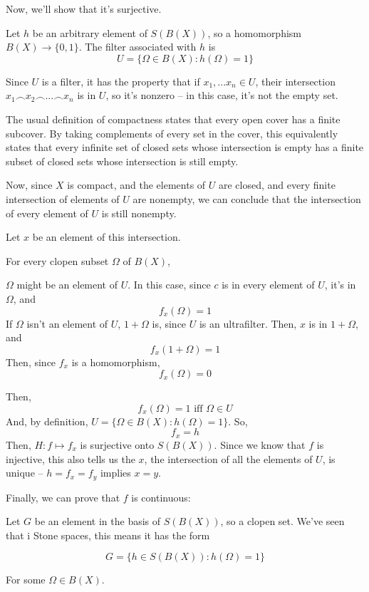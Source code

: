 \documentclass{article}
\begin{document}
      Now, we'll show that it's surjective.

      Let $h$ be an arbitrary element of $S(B(X))$, so a homomorphism $B(X)
      \rightarrow \{0,1\}$. The filter associated with $h$ is
      \[U = \{\Omega \in B(X) : h(\Omega) = 1\}\]

      Since $U$ is a filter, it has the property that if $x_1, ... x_n \in U$,
      their intersection $x_1 \frown x_2 \frown ... \frown x_n$ is in $U$, so
      it's nonzero -- in this case, it's not the empty set.

      The usual definition of compactness states that every open cover has a
      finite subcover. By taking complements of every set in the cover, this
      equivalently states that every infinite set of closed sets whose
      intersection is empty has a finite subset of closed sets whose
      intersection is still empty.

      Now, since $X$ is compact, and the elements of $U$ are closed, and every
      finite intersection of elements of $U$ are nonempty, we can conclude that
      the intersection of every element of $U$ is still nonempty.

      Let $x$ be an element of this intersection.

      For every clopen subset $\Omega$ of $B(X)$,

      $\Omega$ might be an element of $U$. In this case, since $c$ is in every
      element of $U$, it's in $\Omega$, and
      \[f_x(\Omega) = 1\]
      If $\Omega$ isn't an element of $U$, $1+\Omega$ is, since $U$ is an
      ultrafilter. Then, $x$ is in $1+\Omega$, and
      \[f_x(1+\Omega) = 1\]
      Then, since $f_x$ is a homomorphism,
      \[f_x(\Omega) = 0\]

      Then,
      \[f_x(\Omega) = 1 \text{ iff } \Omega \in U\]
      And, by definition, $U = \{\Omega \in B(X) : h(\Omega) = 1\}$. So,
      \[f_x = h\]
      Then, $H: f \mapsto f_x$ is surjective onto $S(B(X))$. Since we know that
      $f$ is injective, this also tells us the $x$, the intersection of all the
      elements of $U$, is unique -- $h = f_x = f_y$ implies $x=y$.

      Finally, we can prove that $f$ is continuous:

      Let $G$ be an element in the basis of $S(B(X))$, so a clopen set. We've
      seen that i Stone spaces, this means it has the form

      \[G = \{h \in S(B(X)): h(\Omega) = 1\}\]

      For some $\Omega \in B(X)$.
\end{document}
